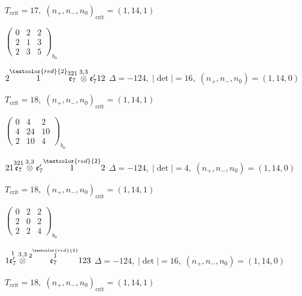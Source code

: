 \documentclass[10pt]{article}
\begin{document}
\hspace{1em}$T_{\text{crit}}=17,\; (n_+,n_-,n_0)_{\text{crit}}=(1,14,1)$

\hspace{2em}$\left(\begin{smallmatrix}0 & 2 & 2 \\ 2 & 1 & 3 \\ 2 & 3 & 5\end{smallmatrix}\right)_{\!b_0}$

\smallskip

$2\overset{\textcolor{red}{2}}{1}\overset{321}{\mathfrak{e}_7}\overset{3,3}{\otimes}\mathfrak{e}_7'12$ \quad $\Delta=-124,\; |\det|=16,\; (n_+,n_-,n_0)=(1,14,0)$

\hspace{1em}$T_{\text{crit}}=18,\; (n_+,n_-,n_0)_{\text{crit}}=(1,14,1)$

\hspace{2em}$\left(\begin{smallmatrix}0 & 4 & 2 \\ 4 & 24 & 10 \\ 2 & 10 & 4\end{smallmatrix}\right)_{\!b_0}$

$21\overset{321}{\mathfrak{e}_7}\overset{3,3}{\otimes}\mathfrak{e}_7'\overset{\textcolor{red}{2}}{1}2$ \quad $\Delta=-124,\; |\det|=4,\; (n_+,n_-,n_0)=(1,14,0)$

\hspace{1em}$T_{\text{crit}}=18,\; (n_+,n_-,n_0)_{\text{crit}}=(1,14,1)$

\hspace{2em}$\left(\begin{smallmatrix}0 & 2 & 2 \\ 2 & 0 & 2 \\ 2 & 2 & 4\end{smallmatrix}\right)_{\!b_0}$

\smallskip

$1\overset{1}{\mathfrak{e}_7'}\overset{3,3}{\otimes}\overset{2\overset{\textcolor{red}{2}}{1}}{\mathfrak{e}_7}123$ \quad $\Delta=-124,\; |\det|=16,\; (n_+,n_-,n_0)=(1,14,0)$

\hspace{1em}$T_{\text{crit}}=18,\; (n_+,n_-,n_0)_{\text{crit}}=(1,14,1)$
\end{document}
